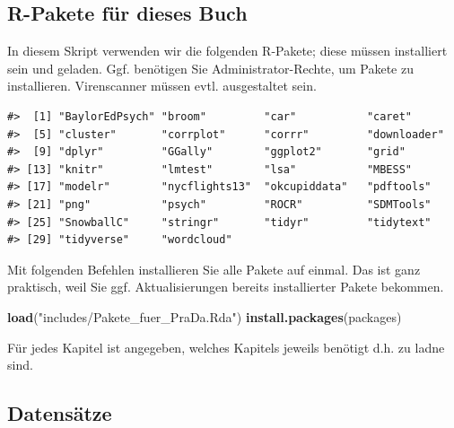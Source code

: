 \documentclass[12pt,ngerman,]{book}
\makeatletter
\newenvironment{Shaded}{\begin{snugshade}}{\end{snugshade}}
\newcommand{\KeywordTok}[1]{\textcolor[rgb]{0.13,0.29,0.53}{\textbf{{#1}}}}
\newcommand{\StringTok}[1]{\textcolor[rgb]{0.31,0.60,0.02}{{#1}}}
\newcommand{\NormalTok}[1]{{#1}}
\newenvironment{kframe}{%
\medskip{}
\setlength{\fboxsep}{.8em}
 \def\at@end@of@kframe{}%
 \ifinner\ifhmode%
  \def\at@end@of@kframe{\end{minipage}}%
  \begin{minipage}{\columnwidth}%
 \fi\fi%
 \def\FrameCommand##1{\hskip\@totalleftmargin \hskip-\fboxsep
 \colorbox{shadecolor}{##1}\hskip-\fboxsep
     \hskip-\linewidth \hskip-\@totalleftmargin \hskip\columnwidth}%
 \MakeFramed {\advance\hsize-\width
   \@totalleftmargin\z@ \linewidth\hsize
   \@setminipage}}%
 {\par\unskip\endMakeFramed%
 \at@end@of@kframe}
\renewenvironment{Shaded}{\begin{kframe}}{\end{kframe}}
\makeatother
\begin{document}
\subsection{R-Pakete für dieses Buch}\label{r-pakete-fur-dieses-buch}

In diesem Skript verwenden wir die folgenden R-Pakete; diese müssen
installiert sein und geladen. Ggf. benötigen Sie Administrator-Rechte,
um Pakete zu installieren. Virenscanner müssen evtl. ausgestaltet sein.

\begin{verbatim}
#>  [1] "BaylorEdPsych" "broom"         "car"           "caret"        
#>  [5] "cluster"       "corrplot"      "corrr"         "downloader"   
#>  [9] "dplyr"         "GGally"        "ggplot2"       "grid"         
#> [13] "knitr"         "lmtest"        "lsa"           "MBESS"        
#> [17] "modelr"        "nycflights13"  "okcupiddata"   "pdftools"     
#> [21] "png"           "psych"         "ROCR"          "SDMTools"     
#> [25] "SnowballC"     "stringr"       "tidyr"         "tidytext"     
#> [29] "tidyverse"     "wordcloud"
\end{verbatim}

Mit folgenden Befehlen installieren Sie alle Pakete auf einmal. Das ist
ganz praktisch, weil Sie ggf. Aktualisierungen bereits installierter
Pakete bekommen.

\begin{Shaded}
\begin{Highlighting}[]
\KeywordTok{load}\NormalTok{(}\StringTok{"includes/Pakete_fuer_PraDa.Rda"}\NormalTok{)}
\KeywordTok{install.packages}\NormalTok{(packages)}
\end{Highlighting}
\end{Shaded}

Für jedes Kapitel ist angegeben, welches Kapitels jeweils benötigt d.h.
zu ladne sind.

\subsection{Datensätze}\label{daten}
\end{document}

